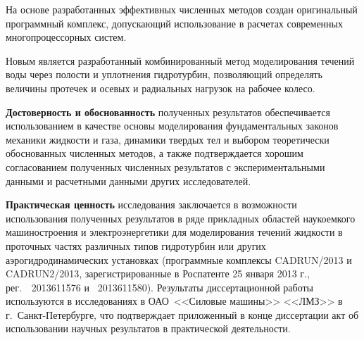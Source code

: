 На основе разработанных эффективных численных методов создан оригинальный программный комплекс, 
допускающий использование в расчетах современных многопроцессорных систем.

Новым является разработанный комбинированный метод моделирования течений воды через 
полости и уплотнения гидротурбин, позволяющий определять величины протечек и осевых и радиальных нагрузок на 
рабочее колесо. 

\textbf{Достоверность и обоснованность} полученных результатов обеспечивается использованием в 
качестве основы моделирования фундаментальных законов механики жидкости и газа, динамики твердых тел и выбором 
теоретически обоснованных численных методов, а также подтверждается хорошим согласованием полученных 
численных результатов с экспериментальными данными и расчетными данными других исследователей.

\textbf{Практическая ценность} исследования заключается в возможности использования 
полученных результатов в ряде прикладных областей наукоемкого машиностроения и электроэнергетики для 
моделирования течений жидкости в проточных частях различных типов гидротурбин или других аэрогидродинамических 
установках (программные комплексы CADRUN/2013 и CADRUN2/2013, зарегистрированные в 
Роспатенте 25 января 2013 г., рег.~\No~2013611576 и \No~2013611580). 
Результаты диссертационной работы используются в исследованиях в ОАО~<<Силовые машины>> <<ЛМЗ>> 
в г.~Санкт-Петербурге, что подтверждает приложенный в конце диссертации акт об использовании научных 
результатов в практической деятельности.

